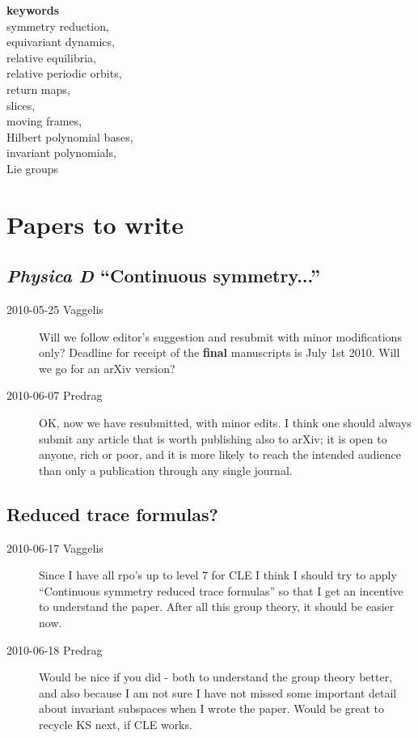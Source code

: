 						\noindent
\textbf{keywords}	\\
symmetry reduction,	\\
equivariant dynamics,	\\
relative equilibria,	\\
relative periodic orbits,	\\
return maps,	\\
slices,	\\
moving frames,	\\
Hilbert polynomial bases,	\\
invariant polynomials,	\\
Lie groups	\\


\section{Papers to write}

\subsection{\emph{Physica D} ``Continuous symmetry...''}

\begin{description}

\item[2010-05-25 Vaggelis]
Will we follow editor's suggestion and resubmit with minor modifications only?
Deadline for receipt of the {\bf final} manuscripts is July 1st 2010.
Will we go for an arXiv version?

\item[2010-06-07 Predrag]
OK, now we have resubmitted, with minor edits. I think one should always submit
any article that is worth publishing also to arXiv;
it is open to anyone, rich or poor, and it is
more likely to reach the intended audience than only a publication through
any single journal.

\end{description}

\subsection{Reduced trace formulas?}

\begin{description}
 \item[2010-06-17 Vaggelis]
Since I have all rpo's up to level 7 for CLE I think I should try
to apply ``Continuous symmetry reduced trace formulas'' so that I get an incentive
to understand the paper. After all this group theory, it should be easier now.
 \item[2010-06-18 Predrag]
Would be nice if you did - both to understand the group theory better, and
also because I am not sure I have not missed some important detail about
invariant subspaces when I wrote the paper. Would be great to recycle KS
next, if CLE works.
\end{description}


